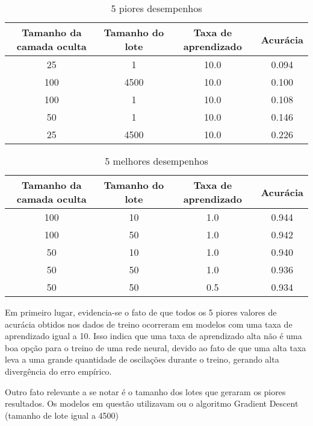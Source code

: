 \documentclass{article}
\begin{document}
\begin{table}[H]
    \centering
        \captionsetup{labelformat=empty} 
        \caption{5 piores desempenhos}
        \begin{tabular}{c c c c}
        \hline
        Tamanho da camada oculta & Tamanho do lote & Taxa de aprendizado & Acurácia \\
        \hline
         25 &    1 & 10.0 & 0.094 \\
        100 & 4500 & 10.0 & 0.100 \\
        100 &    1 & 10.0 & 0.108 \\
         50 &    1 & 10.0 & 0.146 \\
         25 & 4500 & 10.0 & 0.226 \\
        \hline
        \end{tabular}
\end{table}

\begin{table}[H]
    \centering
        \captionsetup{labelformat=empty} 
        \caption{5 melhores desempenhos}
        \begin{tabular}{c c c c}
        \hline
        Tamanho da camada oculta & Tamanho do lote & Taxa de aprendizado & Acurácia \\
        \hline
            100 & 10 & 1.0 & 0.944 \\
            100 & 50 & 1.0 & 0.942 \\
             50 & 10 & 1.0 & 0.940 \\
             50 & 50 & 1.0 & 0.936 \\
             50 & 50 & 0.5 & 0.934 \\
        \hline
        \end{tabular}
\end{table}

Em primeiro lugar, evidencia-se o fato de que todos os 5 piores valores de acurácia obtidos nos dados de treino
ocorreram em modelos com uma taxa de aprendizado igual a 10. Isso indica que uma taxa de aprendizado alta
não é uma boa opção para o treino de uma rede neural, devido ao fato de que uma alta taxa leva a uma grande
quantidade de oscilações durante o treino, gerando alta divergência do erro empírico.

Outro fato relevante a se notar é o tamanho dos lotes que geraram os piores resultados. Os modelos em questão
utilizavam ou o algoritmo Gradient Descent (tamanho de lote igual a 4500)
\end{document}
